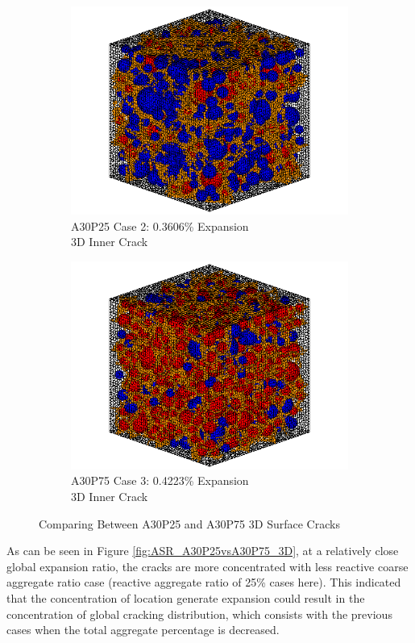 \begin{figure}[ht!]
\centering

    \begin{subfigure}{.5\textwidth}
      \centering
      \includegraphics[width=.8\linewidth]{Files/exp_3D/ASR/A30P25_2_c.png}
    \caption{A30P25 Case 2: 0.3606\% Expansion \\ 3D Inner Crack}
    \end{subfigure}%
    \begin{subfigure}{.5\textwidth}
      \centering
      \includegraphics[width=.8\linewidth]{Files/exp_3D/ASR/A30P75_3_c.png}
    \caption{A30P75 Case 3: 0.4223\% Expansion\\ 3D Inner Crack}
    \end{subfigure}

  \caption{Comparing Between A30P25 and A30P75 3D Surface Cracks}
  \label{fig:ASR_A30P25vsA30P75_3D_crack}
\end{figure}

As can be seen in Figure \ref{fig:ASR_A30P25vsA30P75_3D}, at a relatively close global expansion ratio, the cracks are more concentrated with less reactive coarse aggregate ratio case (reactive aggregate ratio of 25\% cases here). This indicated that the concentration of location generate expansion could result in the concentration of global cracking distribution, which consists with the previous cases when the total aggregate percentage is decreased.

